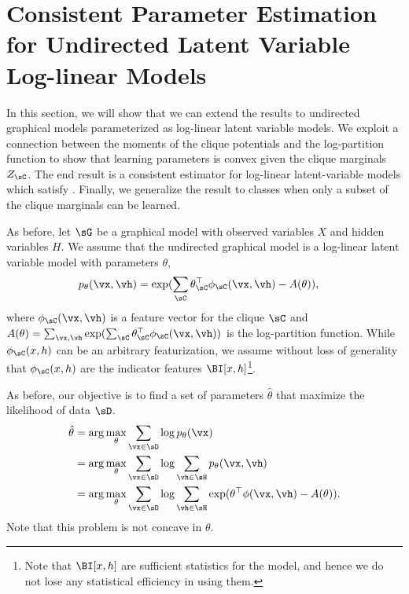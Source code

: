 \section{Consistent Parameter Estimation for Undirected Latent Variable Log-linear Models}
\label{sec:undirected}

In this section, we will show that we can extend the results to
  undirected graphical models parameterized as log-linear latent variable
  models.
We exploit a connection between the moments of the clique potentials and
  the log-partition function to show that learning parameters is convex
  given the clique marginals $Z_\sC$. 
The end result is a consistent estimator for log-linear
  latent-variable models which satisfy .
Finally, we generalize the result to classes when only a subset of the
  clique marginals can be learned.

As before, let $\sG$ be a graphical model with observed variables $X$ and hidden variables $H$.
We assume that the undirected graphical model is a log-linear latent
  variable model with parameters $\theta$,
\begin{align*}
  p_\theta(\vx, \vh) &= \exp( \sum_\sC \theta_\sC^\top \phi_\sC(\vx,\vh) - A(\theta) ),
\end{align*}
where $\phi_\sC(\vx,\vh)$ is a feature vector for the clique $\sC$ and
  $A(\theta) = \sum_{\vx, \vh}  \exp( \sum_\sC \theta_\sC^\top \phi_\sC(\vx,\vh) )$ is the
  log-partition function.
While $\phi_\sC(x,h)$ can be an arbitrary featurization, we assume
  without loss of generality that $\phi_\sC(x,h)$ are the indicator
  features $\BI[x,h]$\footnote{Note that $\BI[x,h]$ are sufficient
  statistics for the model, and hence we do not lose any statistical
  efficiency in using them.}.

As before, our objective is to find a set of parameters $\hat \theta$
  that maximize the likelihood of data $\sD$.
\begin{align}
  \hat \theta 
      &= \arg\max_{\theta} \sum_{\vx \in \sD} \log p_\theta(\vx) \nonumber \\
      &= \arg\max_{\theta} \sum_{\vx \in \sD} \log \sum_{\vh \in \sH} p_\theta(\vx,\vh) \nonumber \\
      &= \arg\max_{\theta} \sum_{\vx \in \sD} \log \sum_{\vh \in \sH} \exp( \theta^\top\phi(\vx,\vh) - A(\theta) ). \label{eqn:obj-ml}
\end{align}
Note that this problem is not concave in $\theta$. 


